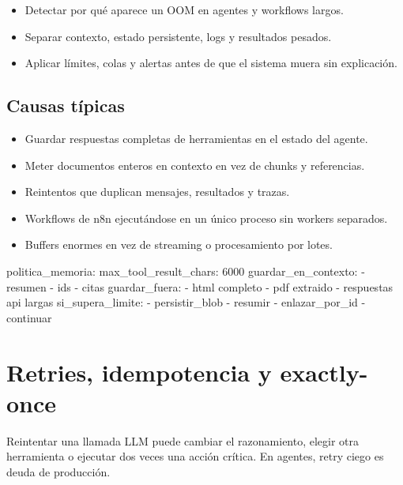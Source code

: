 \documentclass[11pt,a4paper]{book}
\begin{document}
\begin{itemize}\item Detectar por qué aparece un OOM en agentes y workflows largos.\end{itemize}
\begin{itemize}\item Separar contexto, estado persistente, logs y resultados pesados.\end{itemize}
\begin{itemize}\item Aplicar límites, colas y alertas antes de que el sistema muera sin explicación.\end{itemize}
\section{Causas típicas}
\begin{itemize}\item Guardar respuestas completas de herramientas en el estado del agente.\end{itemize}
\begin{itemize}\item Meter documentos enteros en contexto en vez de chunks y referencias.\end{itemize}
\begin{itemize}\item Reintentos que duplican mensajes, resultados y trazas.\end{itemize}
\begin{itemize}\item Workflows de n8n ejecutándose en un único proceso sin workers separados.\end{itemize}
\begin{itemize}\item Buffers enormes en vez de streaming o procesamiento por lotes.\end{itemize}
\begin{codebox}
politica_memoria:
  max_tool_result_chars: 6000
  guardar_en_contexto:
    - resumen
    - ids
    - citas
  guardar_fuera:
    - html completo
    - pdf extraido
    - respuestas api largas
  si_supera_limite:
    - persistir_blob
    - resumir
    - enlazar_por_id
    - continuar
\end{codebox}
\chapter{Retries, idempotencia y exactly-once}
Reintentar una llamada LLM puede cambiar el razonamiento, elegir otra herramienta o ejecutar dos veces una acción crítica. En agentes, retry ciego es deuda de producción.
\end{document}
